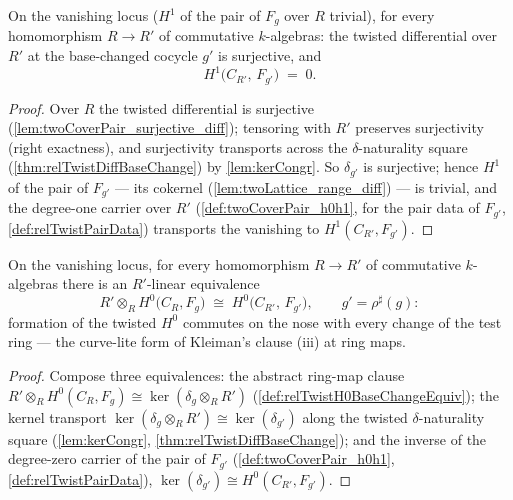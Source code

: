 \begin{theorem}
  \label{thm:relTwist_h1_baseChange}
  \leanok
  On the vanishing locus (\(H^1\) of the pair of \(F_g\) over \(R\) trivial), for
  every homomorphism \(R \to R'\) of commutative \(k\)-algebras: the twisted
  differential over \(R'\) at the base-changed cocycle \(g'\) is surjective, and
  \[
    H^1\bigl(C_{R'},\, F_{g'}\bigr) \;=\; 0 .
  \]
\end{theorem}
\begin{proof}
  \leanok
  Over \(R\) the twisted differential is surjective
  (\ref{lem:twoCoverPair_surjective_diff}); tensoring with \(R'\) preserves
  surjectivity (right exactness), and surjectivity transports across the
  \(\delta\)-naturality square (\ref{thm:relTwistDiffBaseChange}) by
  \ref{lem:kerCongr}. So \(\delta_{g'}\) is surjective; hence \(H^1\) of the pair of
  \(F_{g'}\) --- its cokernel (\ref{lem:twoLattice_range_diff}) --- is trivial, and
  the degree-one carrier over \(R'\) (\ref{def:twoCoverPair_h0h1}, for the pair data
  of \(F_{g'}\), \ref{def:relTwistPairData}) transports the vanishing to
  \(H^1(C_{R'}, F_{g'})\).
\end{proof}

\begin{definition}
  \label{def:relTwistH0BaseChange}
  \leanok
  On the vanishing locus, for every homomorphism \(R \to R'\) of commutative
  \(k\)-algebras there is an \(R'\)-linear equivalence
  \[
    R' \otimes_R H^0\bigl(C_R, F_g\bigr) \;\cong\;
      H^0\bigl(C_{R'},\, F_{g'}\bigr), \qquad g' = \rho^{\sharp}(g) :
  \]
  formation of the twisted \(H^0\) commutes on the nose with every change of the test
  ring --- the curve-lite form of Kleiman's clause (iii) at ring maps.
\end{definition}
\begin{proof}
  \leanok
  Compose three equivalences: the abstract ring-map clause
  \(R' \otimes_R H^0(C_R, F_g) \cong \ker(\delta_g \otimes_R R')\)
  (\ref{def:relTwistH0BaseChangeEquiv}); the kernel transport
  \(\ker(\delta_g \otimes_R R') \cong \ker(\delta_{g'})\) along the twisted
  \(\delta\)-naturality square (\ref{lem:kerCongr},
  \ref{thm:relTwistDiffBaseChange}); and the inverse of the degree-zero carrier of the
  pair of \(F_{g'}\) (\ref{def:twoCoverPair_h0h1}, \ref{def:relTwistPairData}),
  \(\ker(\delta_{g'}) \cong H^0(C_{R'}, F_{g'})\).
\end{proof}

